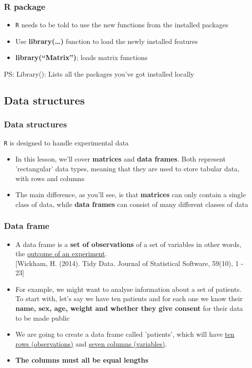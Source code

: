 \documentclass{beamer}
\begin{document}
\begin{frame}[fragile]
	\frametitle{R package}
	\begin{itemize}
	\small
		\item \texttt{R} needs to be told to use the new functions from the installed packages 
		\item Use \textbf{library(\ldots)} function to load the newly installed features
		\item \textbf{library(``Matrix'')};  loads matrix functions
	\end{itemize}
	\footnotesize PS: Library(): Lists all the packages you've got installed locally
\end{frame}


\subsection{Data structures}


\begin{frame}[fragile]
	\frametitle{Data structures}
	\centering \LARGE \texttt{R} is designed to handle experimental data
	\begin{itemize}
		\small
		\item In this lesson, we'll cover \textbf{matrices} and \textbf{data frames}. Both represent 'rectangular' data types, meaning that they are used to store tabular data, with rows and columns
		\item The main difference, as you'll see, is that \textbf{matrices} can only contain a single class of data, while \textbf{data frames} can consist of many different classes of data
	\end{itemize}
\end{frame}

\begin{frame}[fragile]
	\frametitle{Data frame}
	\begin{itemize}
		\small
		\item A data frame is a \textbf{set of observations} of a set of variables  in other words, the \underline{outcome of an experiment}.\\ 
			\tiny [Wickham, H. (2014). Tidy Data. Journal of Statistical Software, 59(10), 1 - 23] 

		\small
		\item For example, we might want to analyse information about a set of patients. To start with, let's say we have ten patients and for each one we know their \textbf{name, sex, age, weight and whether they give consent} for their data to be made public
		\item We are going to create a data frame called 'patients', which will have \underline{ten rows (observations)} and \underline{seven columns (variables)}. 
		\item \textbf{The columns must all be equal lengths}

	\end{itemize}
\end{frame}
\end{document}
